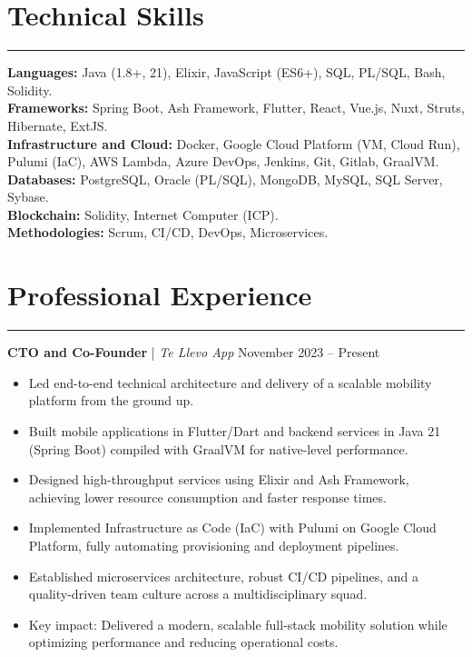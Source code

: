 \documentclass[11pt,a4paper]{article}
\begin{document}
\section*{Technical Skills}
\hrule
\vspace{5pt}
\textbf{Languages:} Java (1.8+, 21), Elixir, JavaScript (ES6+), SQL, PL/SQL, Bash, Solidity. \\
\textbf{Frameworks:} Spring Boot, Ash Framework, Flutter, React, Vue.js, Nuxt, Struts, Hibernate, ExtJS. \\
\textbf{Infrastructure and Cloud:} Docker, Google Cloud Platform (VM, Cloud Run), Pulumi (IaC), AWS Lambda, Azure DevOps, Jenkins, Git, Gitlab, GraalVM. \\
\textbf{Databases:} PostgreSQL, Oracle (PL/SQL), MongoDB, MySQL, SQL Server, Sybase. \\
\textbf{Blockchain:} Solidity, Internet Computer (ICP). \\
\textbf{Methodologies:} Scrum, CI/CD, DevOps, Microservices.

\section*{Professional Experience}
\hrule
\vspace{5pt}

\textbf{CTO and Co-Founder} | \textit{Te Llevo App} \hfill November 2023 -- Present \\
\begin{itemize}[noitemsep, topsep=0pt]
    \item Led end-to-end technical architecture and delivery of a scalable mobility platform from the ground up.
    \item Built mobile applications in Flutter/Dart and backend services in Java 21 (Spring Boot) compiled with GraalVM for native-level performance.
    \item Designed high-throughput services using Elixir and Ash Framework, achieving lower resource consumption and faster response times.
    \item Implemented Infrastructure as Code (IaC) with Pulumi on Google Cloud Platform, fully automating provisioning and deployment pipelines.
    \item Established microservices architecture, robust CI/CD pipelines, and a quality-driven team culture across a multidisciplinary squad.
    \item Key impact: Delivered a modern, scalable full-stack mobility solution while optimizing performance and reducing operational costs.
\end{itemize}
\end{document}
